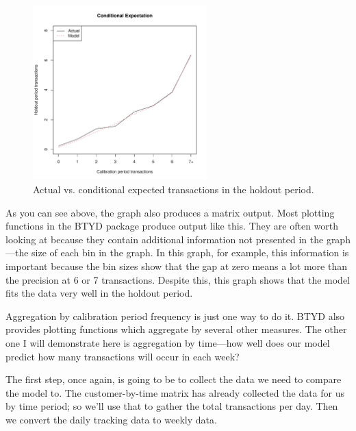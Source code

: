 \documentclass[10pt, letterpaper, onecolumn, oneside, final]{article}\usepackage[]{graphicx}\usepackage[]{color}
\begin{document}
\begin{figure}
  \begin{center}
  \includegraphics[width=0.6\textwidth]{figure/pnbdCondExpComp}
  \caption{Actual vs. conditional expected transactions in the holdout period.}\label{fig:pnbdCondExpComp}
  \end{center}
\end{figure}

As you can see above, the graph also produces a matrix output. Most
plotting functions in the BTYD package produce output like this. They
are often worth looking at because they contain additional information
not presented in the graph---the size of each bin in the graph. In
this graph, for example, this information is important because the bin
sizes show that the gap at zero means a lot more than the precision at
6 or 7 transactions. Despite this, this graph shows that the model
fits the data very well in the holdout period.

Aggregation by calibration period frequency is just one way to do
it. BTYD also provides plotting functions which aggregate by several
other measures. The other one I will demonstrate here is aggregation
by time---how well does our model predict how many transactions will
occur in each week?

The first step, once again, is going to be to collect the data we need
to compare the model to. The customer-by-time matrix has already
collected the data for us by time period; so we'll use that to gather
the total transactions per day. Then we convert the daily tracking
data to weekly data.
\end{document}
